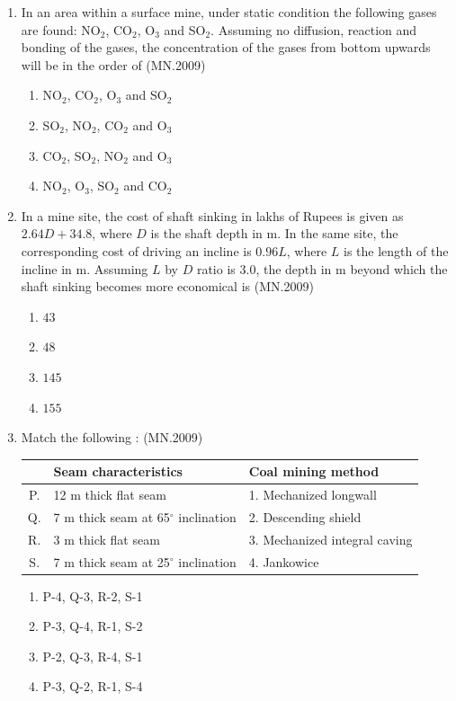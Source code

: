 \documentclass[journal]{IEEEtran}
\numberwithin{equation}{enumi}
\numberwithin{figure}{enumi}
\begin{document}
\begin{enumerate}
\item In an area within a surface mine, under static condition the following gases are found: NO$_2$, CO$_2$, O$_3$ and SO$_2$. Assuming no diffusion, reaction and bonding of the gases, the concentration of the gases from bottom upwards will be in the order of
\hfill{(MN.2009)}
\begin{enumerate}[label=(\Alph*)]
\item NO$_2$, CO$_2$, O$_3$ and SO$_2$
\item SO$_2$, NO$_2$, CO$_2$ and O$_3$
\item CO$_2$, SO$_2$, NO$_2$ and O$_3$
\item NO$_2$, O$_3$, SO$_2$ and CO$_2$
\end{enumerate}

\item In a mine site, the cost of shaft sinking in lakhs of Rupees is given as $2.64D + 34.8$, where $D$ is the shaft depth in m. In the same site, the corresponding cost of driving an incline is $0.96L$, where $L$ is the length of the incline in m. Assuming $L$ by $D$ ratio is 3.0, the depth in m beyond which the shaft sinking becomes more economical is
\hfill{(MN.2009)}
\begin{enumerate}[label=(\Alph*)]
\item $43$
\item $48$
\item $145$
\item $155$
\end{enumerate}

\item Match the following :
\hfill{(MN.2009)}
\begin{center}
\begin{tabular}{|c|l|l|}
\hline
& \textbf{Seam characteristics} & \textbf{Coal mining method} \\
\hline
P. & 12 m thick flat seam & 1. Mechanized longwall \\
Q. & 7 m thick seam at 65$^\circ$ inclination & 2. Descending shield \\
R. & 3 m thick flat seam & 3. Mechanized integral caving \\
S. & 7 m thick seam at 25$^\circ$ inclination & 4. Jankowice \\
\hline
\end{tabular}
\end{center}

\begin{enumerate}[label=(\Alph*)]
\item P-4, Q-3, R-2, S-1
\item P-3, Q-4, R-1, S-2
\item P-2, Q-3, R-4, S-1
\item P-3, Q-2, R-1, S-4
\end{enumerate}


\end{enumerate}
\end{document}
